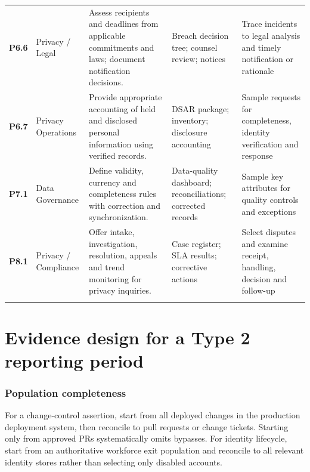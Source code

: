 \documentclass[10pt,oneside]{report}
\begin{document}
\begin{landscape}
\begin{longtable}{@{}>{\raggedright\arraybackslash}p{0.6in}>{\raggedright\arraybackslash}p{1.0in}>{\raggedright\arraybackslash}p{2.5in}>{\raggedright\arraybackslash}p{2.35in}>{\raggedright\arraybackslash}p{2.20in}@{}}
\addlinespace[5pt]
\textbf{P6.6} & Privacy / Legal & Assess recipients and deadlines from applicable commitments and laws; document notification decisions. & Breach decision tree; counsel review; notices & Trace incidents to legal analysis and timely notification or rationale \\
\addlinespace[5pt]
\textbf{P6.7} & Privacy Operations & Provide appropriate accounting of held and disclosed personal information using verified records. & DSAR package; inventory; disclosure accounting & Sample requests for completeness, identity verification and response \\
\addlinespace[5pt]
\textbf{P7.1} & Data Governance & Define validity, currency and completeness rules with correction and synchronization. & Data-quality dashboard; reconciliations; corrected records & Sample key attributes for quality controls and exceptions \\
\addlinespace[5pt]
\textbf{P8.1} & Privacy / Compliance & Offer intake, investigation, resolution, appeals and trend monitoring for privacy inquiries. & Case register; SLA results; corrective actions & Select disputes and examine receipt, handling, decision and follow-up \\
\addlinespace[5pt]
\bottomrule\end{longtable}\end{landscape}\normalsize
\chapter{Evidence design for a Type 2 reporting period}
\subsection{Population completeness}
For a change-control assertion, start from all deployed changes in the production deployment system, then reconcile to pull requests or change tickets. Starting only from approved PRs systematically omits bypasses. For identity lifecycle, start from an authoritative workforce exit population and reconcile to all relevant identity stores rather than selecting only disabled accounts.
\end{document}
